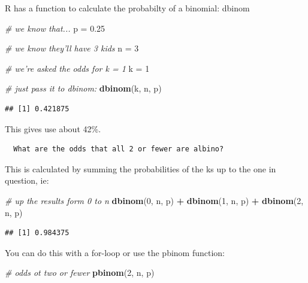 \documentclass[]{article}
\newenvironment{Shaded}{\begin{snugshade}}{\end{snugshade}}
\newcommand{\KeywordTok}[1]{\textcolor[rgb]{0.13,0.29,0.53}{\textbf{#1}}}
\newcommand{\DecValTok}[1]{\textcolor[rgb]{0.00,0.00,0.81}{#1}}
\newcommand{\FloatTok}[1]{\textcolor[rgb]{0.00,0.00,0.81}{#1}}
\newcommand{\StringTok}[1]{\textcolor[rgb]{0.31,0.60,0.02}{#1}}
\newcommand{\CommentTok}[1]{\textcolor[rgb]{0.56,0.35,0.01}{\textit{#1}}}
\newcommand{\OperatorTok}[1]{\textcolor[rgb]{0.81,0.36,0.00}{\textbf{#1}}}
\newcommand{\NormalTok}[1]{#1}
\begin{document}
R has a function to calculate the probabilty of a binomial: dbinom

\begin{Shaded}
\begin{Highlighting}[]
\CommentTok{# we know that...}
\NormalTok{p =}\StringTok{ }\FloatTok{0.25}

\CommentTok{# we know they'll have 3 kids}
\NormalTok{n =}\StringTok{ }\DecValTok{3}

\CommentTok{# we're asked the odds for k = 1 }
\NormalTok{k =}\StringTok{ }\DecValTok{1}

\CommentTok{# just pass it to dbinom:}
\KeywordTok{dbinom}\NormalTok{(k, n, p)}
\end{Highlighting}
\end{Shaded}

\begin{verbatim}
## [1] 0.421875
\end{verbatim}

This gives use about 42\%.

\begin{verbatim}
  What are the odds that all 2 or fewer are albino?
\end{verbatim}

This is calculated by summing the probabilities of the ks up to the one
in question, ie:

\begin{Shaded}
\begin{Highlighting}[]
\CommentTok{# up the results form 0 to n}
\KeywordTok{dbinom}\NormalTok{(}\DecValTok{0}\NormalTok{, n, p) }\OperatorTok{+}\StringTok{ }\KeywordTok{dbinom}\NormalTok{(}\DecValTok{1}\NormalTok{, n, p) }\OperatorTok{+}\StringTok{ }\KeywordTok{dbinom}\NormalTok{(}\DecValTok{2}\NormalTok{, n, p)}
\end{Highlighting}
\end{Shaded}

\begin{verbatim}
## [1] 0.984375
\end{verbatim}

You can do this with a for-loop or use the pbinom function:

\begin{Shaded}
\begin{Highlighting}[]
\CommentTok{# odds ot two or fewer }
\KeywordTok{pbinom}\NormalTok{(}\DecValTok{2}\NormalTok{, n, p)}
\end{Highlighting}
\end{Shaded}
\end{document}
